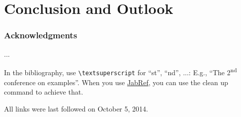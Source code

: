 \documentclass[runningheads,a4paper]{llncs}
\newcommand{\commentatside}[1]{\pdfcomment[color={0.045 0.278 0.643},icon=Note]{#1}}
\newcommand{\todo}[1]{\commentatside{#1}}
\begin{document}
%



%
%

%
%
%
%
%
%
%

\section{Conclusion and Outlook}

\subsubsection*{Acknowledgments}
...

In the bibliography, use \texttt{\textbackslash textsuperscript} for ``st'', ``nd'', ...:
E.g., \enquote{The 2\textsuperscript{nd} conference on examples}.
When you use \href{http://www.jabref.org}{JabRef}, you can use the clean up command to achieve that.




All links were last followed on October 5, 2014.
\end{document}
